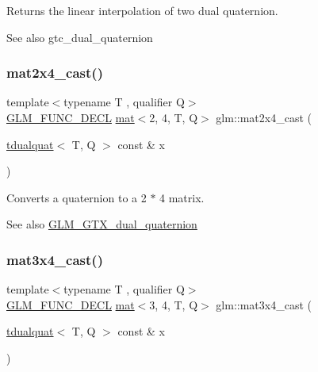 Returns the linear interpolation of two dual quaternion.

\begin{DoxySeeAlso}{See also}
gtc\+\_\+dual\+\_\+quaternion 
\end{DoxySeeAlso}
\mbox{\label{group__gtx__dual__quaternion_gae99d143b37f9cad4cd9285571aab685a}} 
\subsubsection{\texorpdfstring{mat2x4\+\_\+cast()}{mat2x4\_cast()}}
{\footnotesize\ttfamily template$<$typename T , qualifier Q$>$ \\
\hyperlink{setup_8hpp_ab2d052de21a70539923e9bcbf6e83a51}{G\+L\+M\+\_\+\+F\+U\+N\+C\+\_\+\+D\+E\+CL} \hyperlink{structglm_1_1mat}{mat}$<$2, 4, T, Q$>$ glm\+::mat2x4\+\_\+cast (\begin{DoxyParamCaption}\item[{\hyperlink{structglm_1_1tdualquat}{tdualquat}$<$ T, Q $>$ const \&}]{x }\end{DoxyParamCaption})}

Converts a quaternion to a 2 $\ast$ 4 matrix.

\begin{DoxySeeAlso}{See also}
\hyperlink{group__gtx__dual__quaternion}{G\+L\+M\+\_\+\+G\+T\+X\+\_\+dual\+\_\+quaternion} 
\end{DoxySeeAlso}
\mbox{\label{group__gtx__dual__quaternion_gaf59f5bb69620d2891c3795c6f2639179}} 
\subsubsection{\texorpdfstring{mat3x4\+\_\+cast()}{mat3x4\_cast()}}
{\footnotesize\ttfamily template$<$typename T , qualifier Q$>$ \\
\hyperlink{setup_8hpp_ab2d052de21a70539923e9bcbf6e83a51}{G\+L\+M\+\_\+\+F\+U\+N\+C\+\_\+\+D\+E\+CL} \hyperlink{structglm_1_1mat}{mat}$<$3, 4, T, Q$>$ glm\+::mat3x4\+\_\+cast (\begin{DoxyParamCaption}\item[{\hyperlink{structglm_1_1tdualquat}{tdualquat}$<$ T, Q $>$ const \&}]{x }\end{DoxyParamCaption})}

